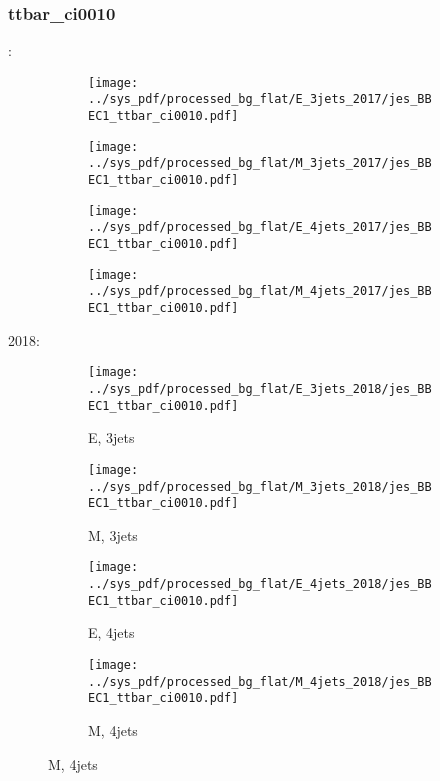 \documentclass{beamer}
\begin{document}
\begin{frame}
\frametitle{ttbar_ci0010}
\fontsize{5}{1}:
\begin{figure}
\centering
\begin{subfigure}[b]{0.24\textwidth}
\texttt{[image: ../sys\_pdf/processed\_bg\_flat/E\_3jets\_2017/jes\_BBEC1\_ttbar\_ci0010.pdf]}
\end{subfigure}
\begin{subfigure}[b]{0.24\textwidth}
\texttt{[image: ../sys\_pdf/processed\_bg\_flat/M\_3jets\_2017/jes\_BBEC1\_ttbar\_ci0010.pdf]}
\end{subfigure}
\begin{subfigure}[b]{0.24\textwidth}
\texttt{[image: ../sys\_pdf/processed\_bg\_flat/E\_4jets\_2017/jes\_BBEC1\_ttbar\_ci0010.pdf]}
\end{subfigure}
\begin{subfigure}[b]{0.24\textwidth}
\texttt{[image: ../sys\_pdf/processed\_bg\_flat/M\_4jets\_2017/jes\_BBEC1\_ttbar\_ci0010.pdf]}
\end{subfigure}
\end{figure}
2018:
\begin{figure}
\centering
\begin{subfigure}[b]{0.24\textwidth}
\texttt{[image: ../sys\_pdf/processed\_bg\_flat/E\_3jets\_2018/jes\_BBEC1\_ttbar\_ci0010.pdf]}
\captionsetup{font=tiny}
\caption{E, 3jets}
\end{subfigure}
\begin{subfigure}[b]{0.24\textwidth}
\texttt{[image: ../sys\_pdf/processed\_bg\_flat/M\_3jets\_2018/jes\_BBEC1\_ttbar\_ci0010.pdf]}
\captionsetup{font=tiny}
\caption{M, 3jets}
\end{subfigure}
\begin{subfigure}[b]{0.24\textwidth}
\texttt{[image: ../sys\_pdf/processed\_bg\_flat/E\_4jets\_2018/jes\_BBEC1\_ttbar\_ci0010.pdf]}
\captionsetup{font=tiny}
\caption{E, 4jets}
\end{subfigure}
\begin{subfigure}[b]{0.24\textwidth}
\texttt{[image: ../sys\_pdf/processed\_bg\_flat/M\_4jets\_2018/jes\_BBEC1\_ttbar\_ci0010.pdf]}
\captionsetup{font=tiny}
\caption{M, 4jets}
\end{subfigure}
\end{figure}
\end{frame}
\end{document}
